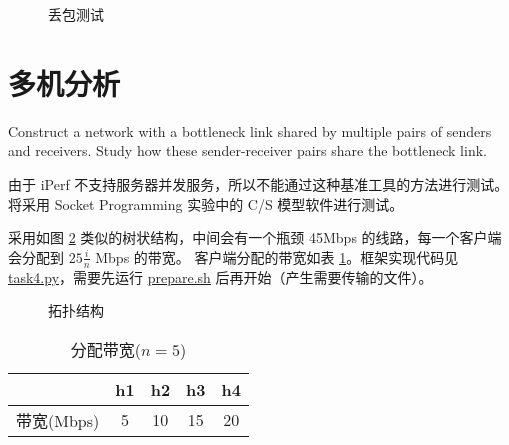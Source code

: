    \begin{figure}[H]
       \centering
       \caption{丢包测试}\label{fig:loss}
    \end{figure}

    \section{多机分析}

    Construct a network with a bottleneck link shared by multiple pairs of senders and receivers. Study how these sender-receiver pairs share the bottleneck link.

    由于 iPerf 不支持服务器并发服务，所以不能通过这种基准工具的方法进行测试。将采用 Socket Programming 实验中的 C/S 模型软件进行测试。

    采用如图 \ref{fig:task4topo} 类似的树状结构，中间会有一个瓶颈 45Mbps 的线路，每一个客户端会分配到 $25\frac{i}{n}$ Mbps 的带宽。
    客户端分配的带宽如表 \ref{tab:bandwidth}。框架实现代码见 \href{./task4.py}{\ttfamily task4.py}，需要先运行 \href{./prepare.sh}{\ttfamily prepare.sh} 后再开始（产生需要传输的文件）。

    \noindent
    \begin{minipage}{0.5\textwidth}
        \begin{figure}[H]
            \centering
            
            \caption{拓扑结构}\label{fig:task4topo}
        \end{figure}
    \end{minipage}
    \begin{minipage}{0.5\textwidth}
        \begin{table}[H]
        \centering
        \caption{分配带宽($n=5$)}\label{tab:bandwidth}
        \begin{tabular}{ccccc}
            \toprule
                & h1 & h2 & h3 & h4\\
            \midrule
            带宽(Mbps) & 5 & 10 & 15 & 20 \\
            \bottomrule
        \end{tabular}
    \end{table}
    \end{minipage}
    \vspace*{5pt}
    
